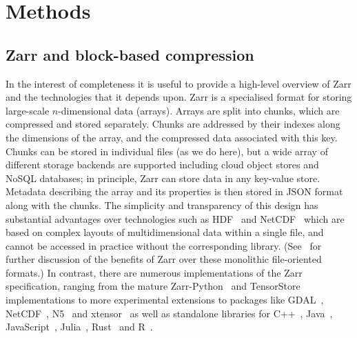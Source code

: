 \documentclass[a4paper,num-refs]{oup-contemporary}
\begin{document}
\section{Methods}

\subsection{Zarr and block-based compression}
In the interest of completeness it is useful to provide a high-level overview
of Zarr and the technologies that it depends upon. Zarr is a specialised format
for storing large-scale $n$-dimensional data (arrays). Arrays
are split into chunks, which are compressed and stored separately. Chunks are 
addressed by their indexes along the dimensions of the array, and the 
compressed data associated with this key. Chunks can
be stored in individual files (as we do here), but a wide array of different
storage backends are supported including cloud object stores 
and NoSQL databases;
in principle, Zarr can store data in any key-value store.
Metadata describing the array and its properties is then stored 
in JSON format along with the chunks. 
The simplicity and transparency
of this design has substantial advantages over technologies
such as HDF~\citep{folk2011overview} and 
NetCDF~\citep{rew1990netcdf} which are based on complex
layouts of multidimensional data within a single file,
and cannot be accessed in practice without the corresponding library.
(See~\cite{abernathey2021cloud} for further discussion of the benefits
of Zarr over these monolithic file-oriented formats.)
In contrast, there are numerous implementations 
of the Zarr specification, ranging 
from the mature Zarr-Python~\citep{zarrpython}
and TensorStore~\citep{tensorstore} implementations
to more experimental extensions to packages like
GDAL~\citep{gdal_zarr},
NetCDF~\citep{netcfd_c},
N5~\citep{n5zarr}
and xtensor~\citep{xtensor_zarr}
as well as  standalone libraries for 
C++~\citep{ruan2024image}, 
Java~\cite{jzarr},
JavaScript~\cite{zarrjs},
Julia~\cite{zarrjl}, Rust~\citep{zarrs}
and R~\cite{pizzarr}.
\end{document}
